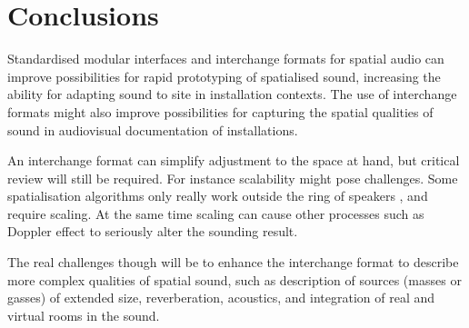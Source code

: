 \documentclass{article}
\begin{document}
\section{Conclusions}\label{sec:conclusions} %

Standardised modular interfaces and interchange formats for spatial audio can improve possibilities for rapid prototyping of spatialised sound, increasing the ability for adapting sound to site in installation contexts. The use of interchange formats might also improve possibilities for capturing the spatial qualities of sound in audiovisual documentation of installations.

An interchange format can simplify adjustment to the space at hand, but critical review will still be required. For instance scalability might pose challenges. Some spatialisation algorithms only really work outside the ring of speakers \cite{Wishart:1996sonic_art}, and require scaling. At the same time scaling can cause other processes such as Doppler effect to seriously alter the sounding result.

The real challenges though will be to enhance the interchange format to describe more complex qualities of spatial sound, such as description of sources (masses or gasses) of extended size, reverberation, acoustics, and integration of real and virtual rooms in the sound.






\end{document}
